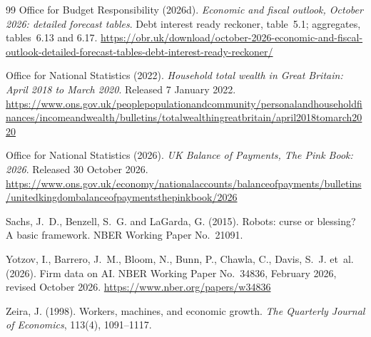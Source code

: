 \begin{thebibliography}{99}
Office for Budget Responsibility (2026d).
\newblock \emph{Economic and fiscal outlook, October 2026: detailed forecast tables}.
\newblock Debt interest ready reckoner, table~5.1; aggregates, tables~6.13 and 6.17.
\newblock \url{https://obr.uk/download/october-2026-economic-and-fiscal-outlook-detailed-forecast-tables-debt-interest-ready-reckoner/} %

Office for National Statistics (2022).
\newblock \emph{Household total wealth in Great Britain: April 2018 to March 2020}.
\newblock Released 7 January 2022.
\newblock \url{https://www.ons.gov.uk/peoplepopulationandcommunity/personalandhouseholdfinances/incomeandwealth/bulletins/totalwealthingreatbritain/april2018tomarch2020}

Office for National Statistics (2026).
\newblock \emph{UK Balance of Payments, The Pink Book: 2026}.
\newblock Released 30 October 2026.
\newblock \url{https://www.ons.gov.uk/economy/nationalaccounts/balanceofpayments/bulletins/unitedkingdombalanceofpaymentsthepinkbook/2026}

Sachs, J.~D., Benzell, S.~G. and LaGarda, G. (2015).
\newblock Robots: curse or blessing? A basic framework.
\newblock NBER Working Paper No.~21091.

Yotzov, I., Barrero, J.~M., Bloom, N., Bunn, P., Chawla, C., Davis, S.~J. et~al. (2026).
\newblock Firm data on AI.
\newblock NBER Working Paper No.~34836, February 2026, revised October 2026.
\newblock \url{https://www.nber.org/papers/w34836}

Zeira, J. (1998).
\newblock Workers, machines, and economic growth.
\newblock \emph{The Quarterly Journal of Economics}, 113(4), 1091--1117.

\end{thebibliography}
